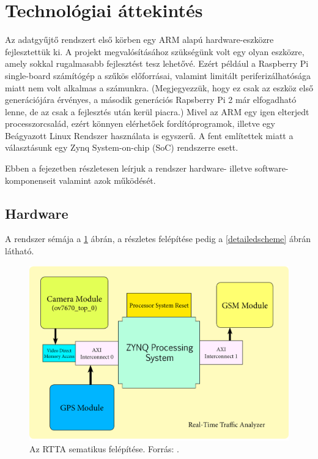 \documentclass[a4paper,12pt]{report}
\begin{document}
\section{Technológiai áttekintés}

Az adatgyűjtő rendszert első körben egy ARM alapú hardware-eszközre fejlesztettük ki. A projekt megvalósításához szükségünk volt egy olyan eszközre, amely sokkal rugalmasabb fejlesztést tesz lehetővé. Ezért például a Raspberry Pi single-board számítógép a szűkös előforrásai, valamint limitált periferizálhatósága miatt nem volt alkalmas a számunkra. (Megjegyezzük, hogy ez csak az eszköz első generációjára érvényes, a második generációs Rapsberry Pi 2 már elfogadható lenne, de az csak a fejlesztés után kerül piacra.) Mivel az ARM egy igen elterjedt processzorcsalád, ezért könnyen elérhetőek fordítóprogramok, illetve egy Beágyazott Linux Rendszer használata is egyszerű. A fent említettek miatt a választásunk egy Zynq System-on-chip (SoC) rendszerre esett.

Ebben a fejezetben részletesen leírjuk a rendszer hardware- illetve software-komponenseit valamint azok működését.

\subsection{Hardware}
\label{rttahw}

A rendszer sémája a \ref{rttaschema} ábrán, a részletes felépítése pedig a \ref{detailedscheme} ábrán látható.

\begin{figure}[h]
\centerline{
\includegraphics[width=6in]{img/sema}}
\caption{Az RTTA sematikus felépítése. Forrás: \cite{usingcoginfocom}.}
\label{rttaschema}
\end{figure}  
\end{document}

